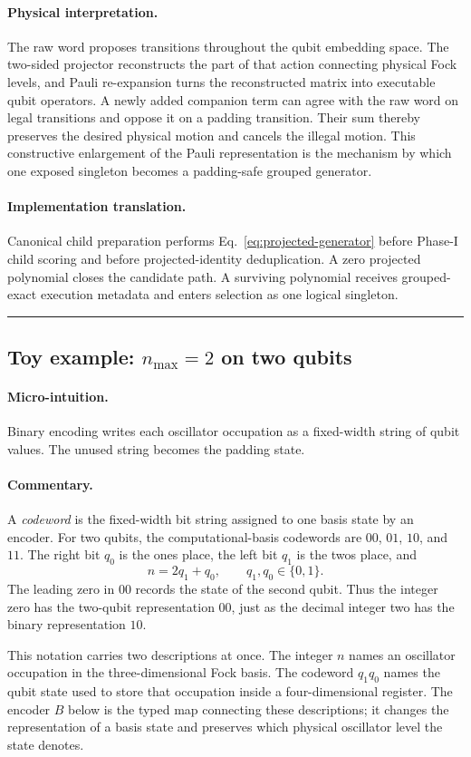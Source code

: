 \documentclass[10pt,twocolumn]{article}
\newcommand{\conceptbreak}{%
  \par\medskip\noindent
  {\color{black!30}\rule{\columnwidth}{0.35pt}}%
  \par\medskip}
\newcommand{\micro}{\paragraph{Micro-intuition.}}
\newcommand{\commentaryblock}{\paragraph{Commentary.}}
\newcommand{\physical}{\paragraph{Physical interpretation.}}
\newcommand{\impl}{\paragraph{Implementation translation.}}
\begin{document}
\physical The raw word proposes transitions throughout the qubit embedding
space. The two-sided projector reconstructs the part of that action connecting
physical Fock levels, and Pauli re-expansion turns the reconstructed matrix
into executable qubit operators. A newly added companion term can agree with
the raw word on legal transitions and oppose it on a padding transition. Their
sum thereby preserves the desired physical motion and cancels the illegal
motion. This constructive enlargement of the Pauli representation is the
mechanism by which one exposed singleton becomes a padding-safe grouped
generator.

\impl Canonical child preparation performs Eq.~\eqref{eq:projected-generator}
before Phase-I child scoring and before projected-identity deduplication. A
zero projected polynomial closes the candidate path. A surviving polynomial
receives grouped-exact execution metadata and enters selection as one logical
singleton.

\conceptbreak

\subsection*{Toy example: \(n_{\max}=2\) on two qubits}

\micro Binary encoding writes each oscillator occupation as a fixed-width
string of qubit values. The unused string becomes the padding state.

\commentaryblock A \emph{codeword} is the fixed-width bit string assigned to
one basis state by an encoder. For two qubits, the computational-basis
codewords are \(00\), \(01\), \(10\), and \(11\). The right bit \(q_0\)
is the ones place, the left bit \(q_1\) is the twos place, and
\[
n=2q_1+q_0,\qquad q_1,q_0\in\{0,1\}.
\]
The leading zero in \(00\) records the state of the second qubit. Thus the
integer zero has the two-qubit representation \(00\), just as the decimal
integer two has the binary representation \(10\).

This notation carries two descriptions at once. The integer \(n\) names an
oscillator occupation in the three-dimensional Fock basis. The codeword
\(q_1q_0\) names the qubit state used to store that occupation inside a
four-dimensional register. The encoder \(B\) below is the typed map connecting
these descriptions; it changes the representation of a basis state and
preserves which physical oscillator level the state denotes.
\end{document}
